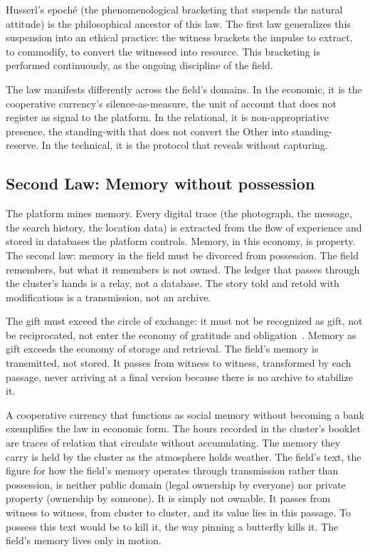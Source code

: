 Husserl's epoché (the phenomenological bracketing that suspends the natural attitude) is the philosophical ancestor of this law. The first law generalizes this suspension into an ethical practice: the witness brackets the impulse to extract, to commodify, to convert the witnessed into resource. This bracketing is performed continuously, as the ongoing discipline of the field.

The law manifests differently across the field's domains. In the economic, it is the cooperative currency's silence-as-measure, the unit of account that does not register as signal to the platform. In the relational, it is non-appropriative presence, the standing-with that does not convert the Other into standing-reserve. In the technical, it is the protocol that reveals without capturing.

\subsection{Second Law: Memory without possession}

The platform mines memory. Every digital trace (the photograph, the message, the search history, the location data) is extracted from the flow of experience and stored in databases the platform controls. Memory, in this economy, is property. The second law: memory in the field must be divorced from possession. The field remembers, but what it remembers is not owned. The ledger that passes through the cluster's hands is a relay, not a database. The story told and retold with modifications is a transmission, not an archive.

The gift must exceed the circle of exchange: it must not be recognized as gift, not be reciprocated, not enter the economy of gratitude and obligation~\cite{derrida1991}. Memory as gift exceeds the economy of storage and retrieval. The field's memory is transmitted, not stored. It passes from witness to witness, transformed by each passage, never arriving at a final version because there is no archive to stabilize it.

A cooperative currency that functions as social memory without becoming a bank exemplifies the law in economic form. The hours recorded in the cluster's booklet are traces of relation that circulate without accumulating. The memory they carry is held by the cluster as the atmosphere holds weather. The field's text, the figure for how the field's memory operates through transmission rather than possession, is neither public domain (legal ownership by everyone) nor private property (ownership by someone). It is simply not ownable. It passes from witness to witness, from cluster to cluster, and its value lies in this passage. To possess this text would be to kill it, the way pinning a butterfly kills it. The field's memory lives only in motion.


